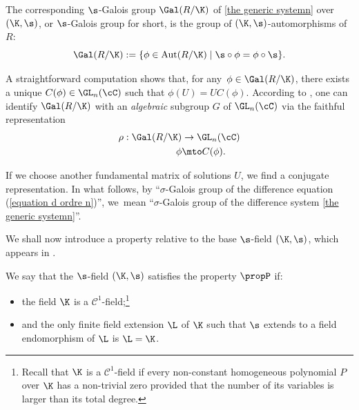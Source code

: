 The corresponding $\s$-Galois group $\Gal(R/\K)$ of \eqref{the generic systemn} over $(\K,\s)$, or $\s$-Galois group for short, is the group of
$(\K,\s)$-automorphisms of $R$:
\[
\Gal(R/\K):=\{ \phi \in \operatorname{Aut}(R/\K) \mid \s\circ\phi=\phi\circ \s \}.
\]

A straightforward computation shows that, for any~$\phi \in \Gal(R/\K)$, there exists a unique ${C(\phi) \in \GL_{n}(\cC)}$ such that $\phi(U)=UC(\phi)$.
According to \cite[Th.\,1.13]{VdPS97}, one can identify $\Gal(R/\K)$ with an \emph{algebraic} subgroup $G$ of $\GL_{n}(\cC)$ via the faithful representation\vspace*{-3pt}
\begin{align*}
\rho : \Gal(R/\K)&\to \GL_{n}(\cC)\\
\phi &\mto C(\phi).
\end{align*}

If we choose another fundamental matrix of solutions $U$, we find a conjugate representation.
In what follows, by ``$\sigma$-Galois group of the difference equation (\ref{equation d ordre n})'', we~mean ``$\sigma$-Galois group of the difference system \eqref{the generic systemn}''.

We shall now introduce a property relative to the base $\s$-field $(\K,\s)$, which appears in \cite[Lem.\,1.19]{VdPS97}.

\begin{defi}\label{prop P}
We say that the $\s$-field $(\K,\s)$ satisfies the property $\propP$ if:
\begin{itemize}
\item the field $\K$ is a $\mathcal{C}^{1}$-field;\footnote{Recall that $\K$ is a $\mathcal{C}^{1}$-field if every non-constant homogeneous polynomial $P$ over $\K$ has a non-trivial zero provided that the number of its variables is larger than its total degree.}
\item and the only finite field extension $\L$ of $\K$ such that $\s$ extends to a field endomorphism of $\L$ is $\L=\K$.
\end{itemize}
\end{defi}

